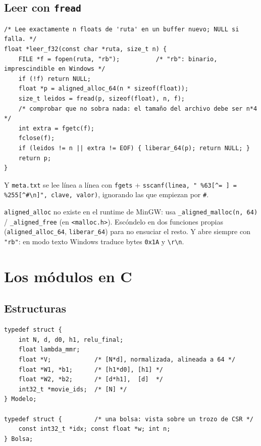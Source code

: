 \documentclass[a4paper,11pt]{article}
\newcommand{\cod}[1]{\texttt{#1}}
\begin{document}
\subsection{Leer con \texttt{fread}}
\begin{lstlisting}[style=c]
/* Lee exactamente n floats de 'ruta' en un buffer nuevo; NULL si falla. */
float *leer_f32(const char *ruta, size_t n) {
    FILE *f = fopen(ruta, "rb");          /* "rb": binario, imprescindible en Windows */
    if (!f) return NULL;
    float *p = aligned_alloc_64(n * sizeof(float));
    size_t leidos = fread(p, sizeof(float), n, f);
    /* comprobar que no sobra nada: el tamaño del archivo debe ser n*4 */
    int extra = fgetc(f);
    fclose(f);
    if (leidos != n || extra != EOF) { liberar_64(p); return NULL; }
    return p;
}
\end{lstlisting}
Y \cod{meta.txt} se lee línea a línea con \cod{fgets} + \cod{sscanf(linea, " \%63[\^{}= ] = \%255[\^{}\#\textbackslash n]", clave, valor)},
ignorando las que empiezan por \cod{\#}.

\begin{ojo}[Windows]
\cod{aligned\_alloc} no existe en el runtime de MinGW: usa \cod{\_aligned\_malloc(n, 64)} / \cod{\_aligned\_free}
(en \cod{<malloc.h>}). Escóndelo en dos funciones propias (\cod{aligned\_alloc\_64}, \cod{liberar\_64}) para no ensuciar
el resto. Y abre siempre con \cod{"rb"}: en modo texto Windows traduce bytes \cod{0x1A} y \cod{\textbackslash r\textbackslash n}.
\end{ojo}

\section{Los módulos en C}

\subsection{Estructuras}
\begin{lstlisting}[style=c]
typedef struct {
    int N, d, d0, h1, relu_final;
    float lambda_mmr;
    float *V;            /* [N*d], normalizada, alineada a 64 */
    float *W1, *b1;      /* [h1*d0], [h1] */
    float *W2, *b2;      /* [d*h1],  [d]  */
    int32_t *movie_ids;  /* [N] */
} Modelo;

typedef struct {         /* una bolsa: vista sobre un trozo de CSR */
    const int32_t *idx; const float *w; int n;
} Bolsa;
\end{lstlisting}
\end{document}
